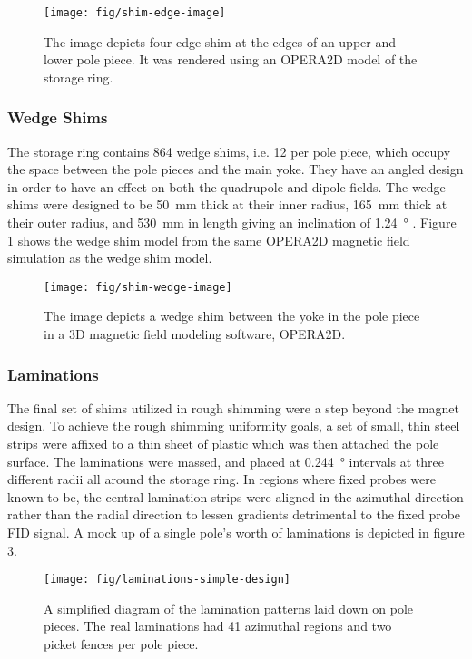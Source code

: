 \begin{figure}[h]
\centering
\texttt{[image: fig/shim-edge-image]}
\caption{
    The image depicts four edge shim at the edges of an upper and lower pole piece.  It was rendered using an OPERA2D model of the storage ring. 
    \label{fig:shim-edge-image}
}
\end{figure}

\subsubsection{Wedge Shims}
The storage ring contains 864 wedge shims, i.e. 12 per pole piece, which occupy the space between the pole pieces and the main yoke.  They have an angled design in order to have an effect on both the quadrupole and dipole fields.  The wedge shims were designed to be \SI{50}{\mm} thick at their inner radius, \SI{165}{\mm} thick at their outer radius, and \SI{530}{\mm} in length giving an inclination of \SI{1.24}{\degree} \cite{danby-magnet}.  Figure \ref{fig:shim-edge-image} shows the wedge shim model from the same OPERA2D magnetic field simulation as the wedge shim model.

\begin{figure}[h]
\centering
\texttt{[image: fig/shim-wedge-image]}
\caption{
    The image depicts a wedge shim between the yoke in the pole piece in a 3D magnetic field modeling software, OPERA2D. 
    \label{fig:shim-wedge-image}
}
\end{figure}

\subsubsection{Laminations}
The final set of shims utilized in rough shimming were a step beyond the magnet design.  To achieve the rough shimming uniformity goals, a set of small, thin steel strips were affixed to a thin sheet of plastic which was then attached the pole surface.  The laminations were massed, and placed at \SI{0.244}{\degree} intervals at three different radii all around the storage ring.  In regions where fixed probes were known to be, the central lamination strips were aligned in the azimuthal direction rather than the radial direction to lessen gradients detrimental to the fixed probe FID signal.  A mock up of a single pole's worth of laminations is depicted in figure \ref{fig:laminations-simple-design}.

\begin{figure}[h]
\centering
\texttt{[image: fig/laminations-simple-design]}
\caption{
    A simplified diagram of the lamination patterns laid down on pole pieces.  The real laminations had 41 azimuthal regions and two picket fences per pole piece. 
    \label{fig:laminations-simple-design}
}
\end{figure}

